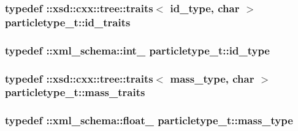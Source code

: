 \subsubsection[{\texorpdfstring{id\+\_\+traits}{id_traits}}]{\setlength{\rightskip}{0pt plus 5cm}typedef \+::xsd\+::cxx\+::tree\+::traits$<$ {\bf id\+\_\+type}, char $>$ {\bf particletype\+\_\+t\+::id\+\_\+traits}}\hypertarget{classparticletype__t_ae11ed5b066a4f0eff6a0fd5c848242be}{}\label{classparticletype__t_ae11ed5b066a4f0eff6a0fd5c848242be}
\subsubsection[{\texorpdfstring{id\+\_\+type}{id_type}}]{\setlength{\rightskip}{0pt plus 5cm}typedef \+::{\bf xml\+\_\+schema\+::int\+\_\+} {\bf particletype\+\_\+t\+::id\+\_\+type}}\hypertarget{classparticletype__t_af4592f0136ed3224434007bc7f5c7fd4}{}\label{classparticletype__t_af4592f0136ed3224434007bc7f5c7fd4}
\subsubsection[{\texorpdfstring{mass\+\_\+traits}{mass_traits}}]{\setlength{\rightskip}{0pt plus 5cm}typedef \+::xsd\+::cxx\+::tree\+::traits$<$ {\bf mass\+\_\+type}, char $>$ {\bf particletype\+\_\+t\+::mass\+\_\+traits}}\hypertarget{classparticletype__t_ac0e07de539bf88441c980a15bb88e1c9}{}\label{classparticletype__t_ac0e07de539bf88441c980a15bb88e1c9}
\subsubsection[{\texorpdfstring{mass\+\_\+type}{mass_type}}]{\setlength{\rightskip}{0pt plus 5cm}typedef \+::{\bf xml\+\_\+schema\+::float\+\_\+} {\bf particletype\+\_\+t\+::mass\+\_\+type}}\hypertarget{classparticletype__t_a7ebd18e57b545977bf3d1573ffa395f7}{}\label{classparticletype__t_a7ebd18e57b545977bf3d1573ffa395f7}
